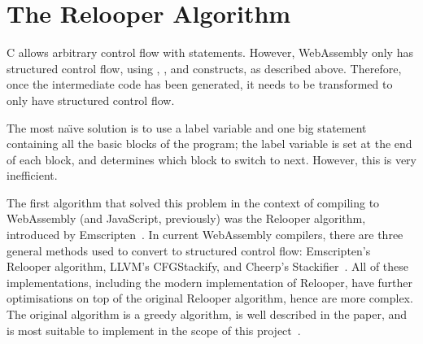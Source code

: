 \documentclass[00-main.tex]{subfiles}
\begin{document}




\section{The Relooper Algorithm}\label{sec:prep:relooper}

C allows arbitrary control flow with  statements.
However, WebAssembly only has structured control flow, using , , and  constructs, as described above.
Therefore, once the intermediate code has been generated, it needs to be transformed to only have structured control flow.

The most na\"{\i}ve solution is to use a label variable and one big  statement containing all the basic blocks of the program; the label variable is set at the end of each block, and determines which block to switch to next.
However, this is very inefficient.

The first algorithm that solved this problem in the context of compiling to WebAssembly (and JavaScript, previously) was the Relooper algorithm, introduced by Emscripten~.
In current Web\-Assembly compilers, there are three general methods used to convert to structured control flow: Emscripten's Relooper algorithm, LLVM's CFGStackify, and Cheerp's Stackifier~.
All of these implementations, including the modern implementation of Relooper, have further optimisations on top of the original Relooper algorithm, hence are more complex.
The original algorithm is a greedy algorithm, is well described in the paper, and is most suitable to implement in the scope of this project~.
\end{document}
